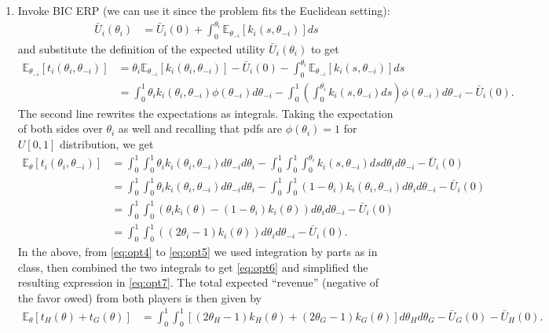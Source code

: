 \documentclass[a4paper]{article}
\begin{document}
\begin{enumerate}
	\item Invoke BIC ERP (we can use it since the problem fits the Euclidean setting):
	\begin{align}
		\bar{U}_i(\theta_i) &= \bar{U}_i(0) + \int_0^{\theta_i} \mathbb{E}_{\theta_{-i}} [k_i(s,\theta_{-i})] ds
	\end{align}
	and substitute the definition of the expected utility $\bar{U}_i(\theta_i)$ to get
	\begin{align}
		\mathbb{E}_{\theta_{-i}} [t_i(\theta_i,\theta_{-i})] 
		&= \theta_i \mathbb{E}_{\theta_{-i}} [k_i(\theta_i,\theta_{-i})] - \bar{U}_i(0) - \int_0^{\theta_i} \mathbb{E}_{\theta_{-i}} [k_i(s,\theta_{-i})] ds
		\\
		&= \int_0^1 \theta_i k_i(\theta_i,\theta_{-i}) \phi(\theta_{-i}) d\theta_{-i} - \int_0^1 \left( \int_0^{\theta_i} k_i(s,\theta_{-i}) ds \right) \phi(\theta_{-i}) d\theta_{-i} - \bar{U}_i(0).
	\end{align}
	The second line rewrites the expectations as integrals. Taking the expectation of both sides over $\theta_i$ as well and recalling that pdfs are $\phi(\theta_i)=1$ for $U[0,1]$ distribution, we get
	\begin{align}
		\mathbb{E}_{\theta} [t_i(\theta_i,\theta_{-i})] 
		&= \int_0^1 \int_0^1 \theta_i k_i(\theta_i,\theta_{-i}) d\theta_{-i} d\theta_{i} - \int_0^1 \int_0^1 \int_0^{\theta_i} k_i(s,\theta_{-i}) ds d\theta_{i} d\theta_{-i} - \bar{U}_i(0)
		\label{eq:opt4}
		\\
		&= \int_0^1 \int_0^1 \theta_i k_i(\theta_i,\theta_{-i}) d\theta_{-i} d\theta_{i} - \int_0^1 \int_0^1 (1-\theta_i) k_i(\theta_i,\theta_{-i}) d\theta_{i} d\theta_{-i} - \bar{U}_i(0)
		\label{eq:opt5}
		\\
		&= \int_0^1 \int_0^1 \left( \theta_i k_i(\theta) - (1-\theta_i) k_i(\theta) \right) d\theta_{i} d\theta_{-i} - \bar{U}_i(0)
		\label{eq:opt6}
		\\
		&= \int_0^1 \int_0^1 \left( (2\theta_i - 1) k_i(\theta) \right) d\theta_{i} d\theta_{-i} - \bar{U}_i(0).
		\label{eq:opt7}
	\end{align}
	In the above, from \eqref{eq:opt4} to \eqref{eq:opt5} we used integration by parts as in class, then combined the two integrals to get \eqref{eq:opt6} and simplified the resulting expression in \eqref{eq:opt7}. The total expected ``revenue'' (negative of the favor owed) from both players is then given by
	\begin{align}
		\mathbb{E}_\theta \left[ t_H(\theta)+t_G(\theta) \right] 
		&= \int_0^1 \int_0^1 \left[ (2\theta_H - 1) k_H(\theta) + (2\theta_G - 1) k_G(\theta) \right] d\theta_H d\theta_G - \bar{U}_G(0) - \bar{U}_H(0).
		\label{eq:opt8}
	\end{align}
	

\end{enumerate}
\end{document}

